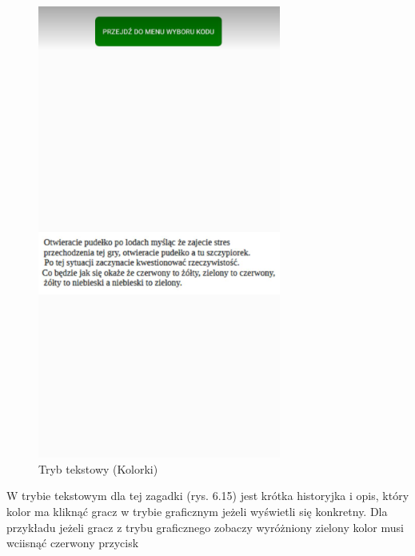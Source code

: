 	\begin{figure}[!htb]
	\begin{center}
		\includegraphics[width=8cm]{rys/tekstowy4.png}
		\caption{Tryb tekstowy (Kolorki)}
		\label{rys:rysunek001}
	\end{center}
\end{figure}
\hspace{-0.60cm}W trybie tekstowym dla tej zagadki (rys. 6.15) jest krótka historyjka i opis, który kolor ma kliknąć gracz w trybie graficznym jeżeli wyświetli się konkretny. Dla przykładu jeżeli gracz z trybu graficznego zobaczy wyróżniony zielony kolor musi wciisnąć czerwony przycisk
\\
\\
\\
\\
\\
\\
